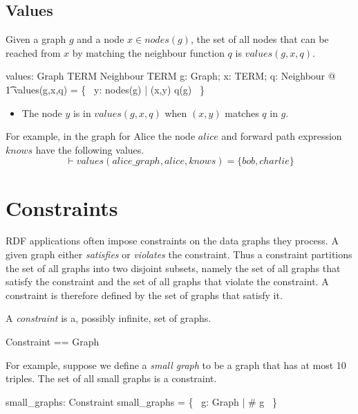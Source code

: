\documentclass{article}
\begin{document}
\subsection{Values}

Given a graph $g$ and a node $x \in nodes(g)$, the set of all nodes that can be reached from $x$ by matching the neighbour function $q$  is $values(g,x,q)$.
\begin{axdef}
values: Graph \cross TERM \cross Neighbour \fun \finset TERM
\where
\forall g: Graph; x: TERM; q: Neighbour @ \\
\t1	values(g,x,q) = \{~ y: nodes(g) | (x,y) \in q(g) ~\}
\end{axdef}
\begin{itemize}
\item The node $y$ is in $values(g,x,q)$ when $(x,y)$ matches $q$ in $g$.
\end{itemize}

For example, in the graph for Alice the node $alice$ and forward path expression $knows$ have the following values.
\[\vdash 
	values(alice\_graph, alice, knows) = \{bob, charlie\}
\]

\section{Constraints}
\label{sec-constraints}

RDF applications often impose constraints on the data graphs they process.
A given graph either {\em satisfies} or {\em violates} the constraint.
Thus a constraint partitions the set of all graphs into two disjoint subsets,
namely the set of all graphs that satisfy the constraint and the set of all graphs that violate the constraint.
A constraint is therefore defined by the set of graphs that satisfy it.

A {\em constraint} is a, possibly infinite, set of graphs. 
\begin{zed}
	Constraint == \power Graph
\end{zed}

For example, suppose we define a {\em small graph} to be a graph that has at most 10 triples.
The set of all small graphs is a constraint.
\begin{axdef}
	small\_graphs: Constraint
\where
	small\_graphs = \{~ g: Graph | \# g  ~\}
\end{axdef}
\end{document}
